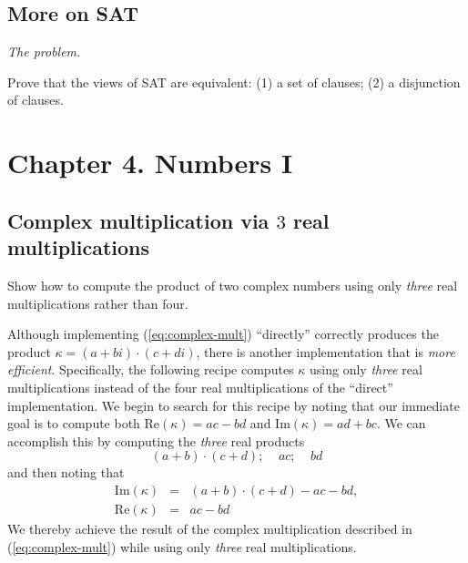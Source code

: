 \subsection{More on SAT}

\noindent \textit{The problem.}

Prove that the views of SAT are equivalent: (1) a set of clauses; (2)
a disjunction of clauses.



\section{Chapter 4. Numbers I}

\subsection{Complex
  multiplication via $3$ real multiplications}

Show how to compute the product of two complex numbers using only {\em three}
real multiplications rather than four.
\medskip

Although implementing (\ref{eq:complex-mult}) ``directly'' correctly
produces the product $\kappa = (a+bi) \cdot (c+di)$, there is another
implementation that is {\em more efficient}.  Specifically, the
following recipe computes $\kappa$ using only {\em three} real
multiplications instead of the four real multiplications of the
``direct'' implementation.  We begin to search for this recipe by
noting that our immediate goal is to compute both Re$(\kappa) = ac-bd$
and Im$(\kappa) = ad+bc$.  We can accomplish this by computing the
{\em three} real products
\begin{equation}
\label{eq:complex-mult-3a}
(a+b) \cdot (c+d); \ \ \ \ \
ac;  \ \ \ \ \ bd
\end{equation}
and then noting that
\begin{equation}
\label{eq:complex-mult-3b}
\begin{array}{lcl}
\mbox{Im}(\kappa) & = & (a+b) \cdot (c+d) - ac -bd, \\
\mbox{Re}(\kappa) & = & ac -bd
\end{array}
\end{equation}
We thereby achieve the result of the complex multiplication described
in (\ref{eq:complex-mult}) while using only {\em three} real
multiplications.


